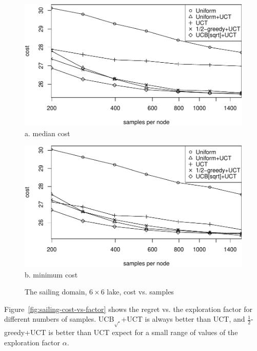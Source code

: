 \documentclass[letterpaper]{article}
\begin{document}
\begin{figure}[h!]
  \begin{minipage}[b]{1.0\linewidth}
    \centering
    \includegraphics[scale=0.45]{costs-size=6-group=median.pdf}\\
    a. median cost
    \vspace{1em}
  \end{minipage}
  \begin{minipage}[b]{1.0\linewidth}
    \centering
    \includegraphics[scale=0.45]{costs-size=6-group=minimum.pdf}\\
    b. minimum cost
  \end{minipage}
  \caption{The sailing domain, $6\times 6$ lake, cost vs. samples}
  \label{fig:sailing-cost-vs-nsamples}
\end{figure}

Figure~\ref{fig:sailing-cost-vs-factor} shows the regret vs. the
exploration factor for different numbers of samples. UCB$_{\sqrt{\cdot}}$+UCT is always better than
UCT, and $\frac 1 2$-greedy+UCT is better than UCT expect for a small range of
values of the exploration factor $\alpha$. 
\end{document}
